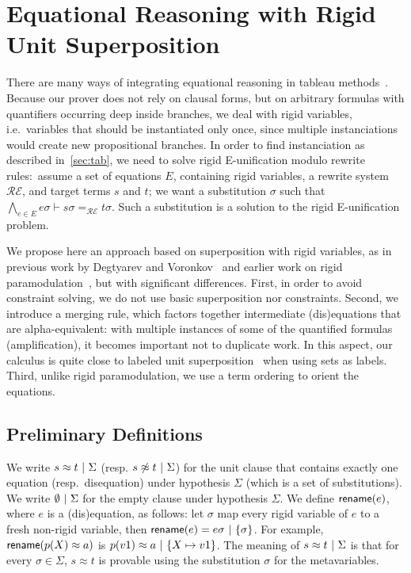 
\section{Equational Reasoning with Rigid Unit Superposition}
\label{sec:super}

There are many ways of integrating equational reasoning in tableau
methods~\cite{DB75,LS02,BR15,DV96}. Because our prover does not rely on clausal
forms, but on arbitrary formulas with quantifiers occurring deep inside
branches, we deal with rigid variables, i.e.~variables that should be instantiated
only once, since multiple instanciations would create new propositional branches.
In order to find instanciation as described in~\ref{sec:tab},
we need to solve rigid E-unification modulo rewrite rules:~assume a set of
equations $E$, containing rigid variables, a rewrite system $\mathcal{RE}$,
and target terms $s$ and $t$; we want a substitution $\sigma$ such that
$\bigwedge_{e \in E} e\sigma \vdash s\sigma =_\mathcal{RE} t\sigma$. Such a
substitution is a solution to the rigid E-unification problem.

We propose here an approach based on superposition with rigid variables, as in
previous work by Degtyarev and Voronkov~\cite{DV96} and earlier work on rigid
paramodulation~\cite{DAP00}, but with significant differences. First, in order
to avoid constraint solving, we do not use basic superposition nor
constraints. Second, we introduce a merging rule, which factors together
intermediate (dis)equations that are alpha-equivalent: with multiple instances
of some of the quantified formulas (amplification), it becomes important not to
duplicate work. In this aspect, our calculus is quite close to labeled unit
superposition~\cite{KS10} when using sets as labels. Third, unlike rigid
paramodulation, we use a term ordering to orient the equations.

\subsection{Preliminary Definitions}

We write $  s \approx t  ~|~  \Sigma$ (resp.
$ s \not\approx t  ~|~  \Sigma$) for the unit clause that contains
exactly one equation (resp.~disequation) under hypothesis $\Sigma$ (which is a
set of substitutions). We write $\emptyset ~|~ \Sigma$ for the
empty clause under hypothesis $\Sigma$. We define $\textsf{rename}(e)$, where $e$
is a (dis)equation, as follows: let $\sigma$ map every rigid variable of $e$ to
a fresh non-rigid variable, then
$\textsf{rename}(e) =  e\sigma  ~|~  \{ \sigma \} $. For example,
$\textsf{rename}(p(X)\approx a)$ is $ p(v1)\approx a ~|~  \{ X\mapsto
v1\} $.
The meaning of $s \approx t ~|~  \Sigma$ is
that for every $\sigma \in \Sigma$, $s \approx t$ is provable using the
substitution $\sigma$ for the metavariables.

